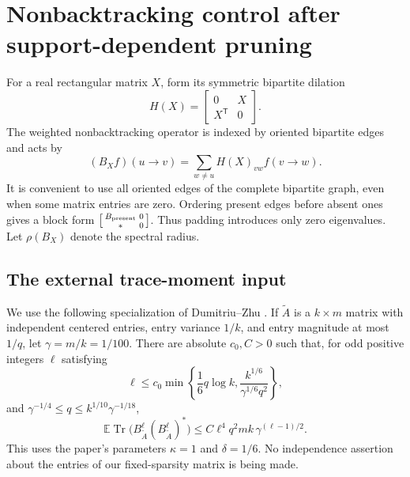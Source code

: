 \documentclass[11pt]{article}
\theoremstyle{definition}
\theoremstyle{remark}
\newcommand{\EE}{\mathbb E}
\newcommand{\tr}{\operatorname{Tr}}
\begin{document}
\section{Nonbacktracking control after support-dependent pruning}\label{sec:nb}

For a real rectangular matrix $X$, form its symmetric bipartite dilation
\[
 H(X)=\begin{bmatrix}0&X\\X^{\mathsf T}&0\end{bmatrix}.
\]
The weighted nonbacktracking operator is indexed by oriented bipartite edges and acts by
\begin{equation}\label{eq:nb-def}
 (B_X f)(u\to v)=\sum_{w\ne u}H(X)_{vw}f(v\to w).
\end{equation}
It is convenient to use all oriented edges of the complete bipartite graph, even when some matrix entries are zero. Ordering present edges before absent ones gives a block form
$\bigl[\begin{smallmatrix}B_{\rm present}&0\\ *&0\end{smallmatrix}\bigr]$.
Thus padding introduces only zero eigenvalues. Let $\rho(B_X)$ denote the spectral radius.

\subsection{The external trace-moment input}

We use the following specialization of Dumitriu--Zhu \cite[Lemma 4.3]{DZ}. If $\widetilde A$ is a $k\times m$ matrix with independent centered entries, entry variance $1/k$, and entry magnitude at most $1/q$, let $\gamma=m/k=1/100$. There are absolute $c_0,C>0$ such that, for odd positive integers $\ell$ satisfying
\begin{equation}\label{eq:DZ-range}
 \ell\leq c_0\min\left\{\frac16q\log k,
                  \frac{k^{1/6}}{\gamma^{1/6}q^2}\right\},
\end{equation}
and $\gamma^{-1/4}\leq q\leq k^{1/10}\gamma^{-1/18}$,
\begin{equation}\label{eq:DZ}
 \EE\tr\bigl(B_{\widetilde A}^{\ell}
                  (B_{\widetilde A}^{\ell})^*\bigr)
 \leq C\ell^4q^2mk\,\gamma^{(\ell-1)/2}.
\end{equation}
This uses the paper's parameters $\kappa=1$ and $\delta=1/6$. No independence assertion about the entries of our fixed-sparsity matrix is being made.
\end{document}
